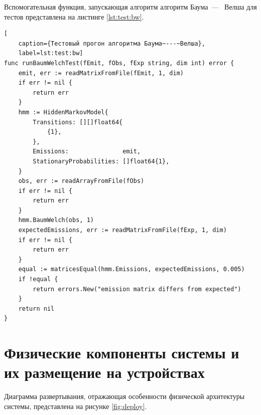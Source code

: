 Вспомогательная функция, запускающая алгоритм алгоритм Баума~--- ~Велша для тестов представлена на листинге \ref{lst:test:bw}.
\begin{lstlisting}[
	caption={Тестовый прогон алгоритма Баума~---~Велша},
	label=lst:test:bw]
func runBaumWelchTest(fEmit, fObs, fExp string, dim int) error {
	emit, err := readMatrixFromFile(fEmit, 1, dim)
	if err != nil {
		return err
	}
	hmm := HiddenMarkovModel{
		Transitions: [][]float64{
			{1},
		},
		Emissions:               emit,
		StationaryProbabilities: []float64{1},
	}
	obs, err := readArrayFromFile(fObs)
	if err != nil {
		return err
	}
	hmm.BaumWelch(obs, 1)
	expectedEmissions, err := readMatrixFromFile(fExp, 1, dim)
	if err != nil {
		return err
	}
	equal := matricesEqual(hmm.Emissions, expectedEmissions, 0.005)
	if !equal {
		return errors.New("emission matrix differs from expected")
	}
	return nil
}
\end{lstlisting}

\section{Физические компоненты системы и их размещение на устройствах}
Диаграмма развертывания, отражающая особенности физической архитектуры системы, представлена на рисунке \ref{fig:deploy}.


